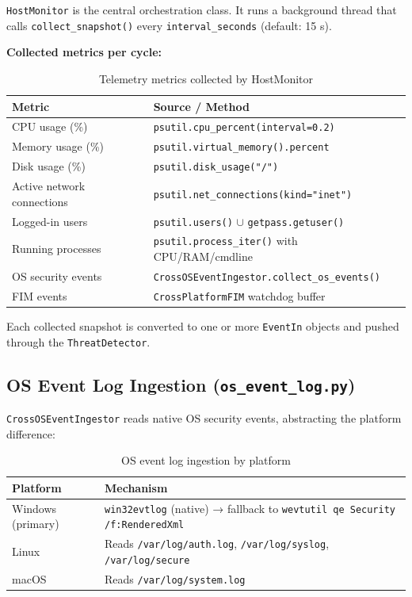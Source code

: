\documentclass[12pt,a4paper]{article}
\begin{document}
\texttt{HostMonitor} is the central orchestration class. It runs a background thread
that calls \texttt{collect\_snapshot()} every \texttt{interval\_seconds} (default: 15 s).

\textbf{Collected metrics per cycle:}

\begin{table}[H]
\centering
\begin{tabularx}{\linewidth}{lX}
\toprule
\textbf{Metric} & \textbf{Source / Method} \\
\midrule
CPU usage (\%) & \texttt{psutil.cpu\_percent(interval=0.2)} \\
Memory usage (\%) & \texttt{psutil.virtual\_memory().percent} \\
Disk usage (\%) & \texttt{psutil.disk\_usage("/")} \\
Active network connections & \texttt{psutil.net\_connections(kind="inet")} \\
Logged-in users & \texttt{psutil.users()} $\cup$ \texttt{getpass.getuser()} \\
Running processes & \texttt{psutil.process\_iter()} with CPU/RAM/cmdline \\
OS security events & \texttt{CrossOSEventIngestor.collect\_os\_events()} \\
FIM events & \texttt{CrossPlatformFIM} watchdog buffer \\
\bottomrule
\end{tabularx}
\caption{Telemetry metrics collected by HostMonitor}
\end{table}

Each collected snapshot is converted to one or more \texttt{EventIn} objects and
pushed through the \texttt{ThreatDetector}.

\subsection{OS Event Log Ingestion (\texttt{os\_event\_log.py})}

\texttt{CrossOSEventIngestor} reads native OS security events, abstracting the
platform difference:

\begin{table}[H]
\centering
\begin{tabularx}{\linewidth}{lX}
\toprule
\textbf{Platform} & \textbf{Mechanism} \\
\midrule
Windows (primary) & \texttt{win32evtlog} (native) → fallback to \texttt{wevtutil qe Security /f:RenderedXml} \\
Linux & Reads \texttt{/var/log/auth.log}, \texttt{/var/log/syslog}, \texttt{/var/log/secure} \\
macOS & Reads \texttt{/var/log/system.log} \\
\bottomrule
\end{tabularx}
\caption{OS event log ingestion by platform}
\end{table}
\end{document}
